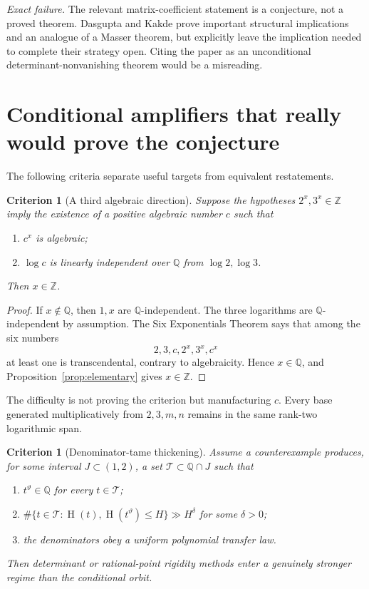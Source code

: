\documentclass[11pt]{article}
\newtheorem{criterion}[theorem]{Criterion}
\theoremstyle{definition}
\theoremstyle{remark}
\newcommand{\Q}{\mathbb Q}
\newcommand{\Z}{\mathbb Z}
\newcommand{\Hgt}{\operatorname{H}}
\begin{document}
\emph{Exact failure.}  The relevant matrix-coefficient statement is a conjecture, not a
proved theorem.  Dasgupta and Kakde prove important structural implications and an analogue
of a Masser theorem, but explicitly leave the implication needed to complete their strategy
open.  Citing the paper as an unconditional determinant-nonvanishing theorem would be a
misreading.

\section{Conditional amplifiers that really would prove the conjecture}
\label{sec:criteria}

The following criteria separate useful targets from equivalent restatements.

\begin{criterion}[A third algebraic direction]\label{crit:third-base}
Suppose the hypotheses $2^x,3^x\in\Z$ imply the existence of a positive algebraic number
$c$ such that
\begin{enumerate}[label=(\roman*),leftmargin=2.2em]
\item $c^x$ is algebraic;
\item $\log c$ is linearly independent over $\Q$ from $\log2,\log3$.
\end{enumerate}
Then $x\in\Z$.
\end{criterion}

\begin{proof}
If $x\notin\Q$, then $1,x$ are $\Q$-independent.  The three logarithms are
$\Q$-independent by assumption.  The Six Exponentials Theorem says that among the six
numbers
\[
 2,3,c,2^x,3^x,c^x
\]
at least one is transcendental, contrary to algebraicity.  Hence $x\in\Q$, and
Proposition~\ref{prop:elementary} gives $x\in\Z$.
\end{proof}

The difficulty is not proving the criterion but manufacturing $c$.  Every base generated
multiplicatively from $2,3,m,n$ remains in the same rank-two logarithmic span.

\begin{criterion}[Denominator-tame thickening]\label{crit:thickening}
Assume a counterexample produces, for some interval $J\subset(1,2)$, a set
$\mathcal T\subset\Q\cap J$ such that
\begin{enumerate}[label=(\roman*),leftmargin=2.2em]
\item $t^\vartheta\in\Q$ for every $t\in\mathcal T$;
\item $\#\{t\in\mathcal T:\Hgt(t),\Hgt(t^\vartheta)\le H\}\gg H^\delta$
      for some $\delta>0$;
\item the denominators obey a uniform polynomial transfer law.
\end{enumerate}
Then determinant or rational-point rigidity methods enter a genuinely stronger regime than
the conditional orbit.
\end{criterion}
\end{document}
